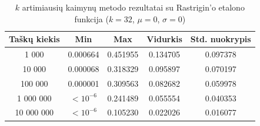 \begin{table}[H]
    \centering
    \begin{tabular}{|c|c|c|c|c|}
        \hline
        \textbf{Taškų kiekis} & \textbf{Min} & \textbf{Max} & \textbf{Vidurkis} & \textbf{Std. nuokrypis} \\ \hline
        1 000        & 0.000664 & 0.451955 & 0.134705 & 0.097378 \\ \hline
        10 000       & 0.000068 & 0.318329 & 0.095897 & 0.070197 \\ \hline
        100 000      & 0.000001 & 0.309563 & 0.082682 & 0.059978 \\ \hline
        1 000 000    & $<10^{-6}$ & 0.241489 & 0.055554 & 0.040353 \\ \hline
        10 000 000   & $<10^{-6}$ & 0.105230 & 0.022026 & 0.016077 \\ \hline
    \end{tabular}
    \caption{$k$ artimiausių kaimynų metodo rezultatai su Rastrigin'o etalono funkcija ($k = 32$, $\mu = 0$, $\sigma = 0$)}
\end{table}